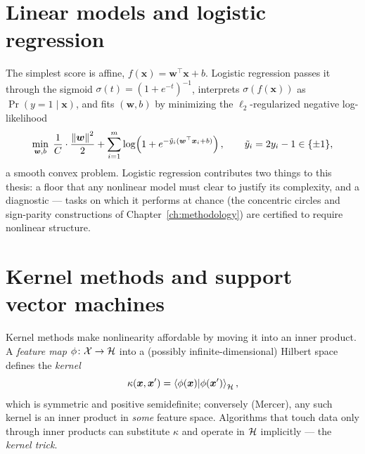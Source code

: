 \section{Linear models and logistic regression}
\label{sec:ml-linear}

The simplest score is affine, $f(\bm{x}) = \bm{w}^{\top} \bm{x} + b$.
Logistic regression passes it through the sigmoid
$\sigma(t) = (1 + e^{-t})^{-1}$, interprets
$\sigma(f(\bm{x}))$ as $\Pr(y = 1 \mid \bm{x})$, and fits $(\bm{w}, b)$ by
minimizing the $\ell_2$-regularized negative log-likelihood
\begin{equation}
  \min_{\bm{w}, b} \; \frac{1}{C} \cdot \frac{\left\lVert\bm{w}\right\rVert^2}{2}
  + \sum_{i=1}^{m} \log\!\left( 1 + e^{-\tilde{y}_i (\bm{w}^{\top}\bm{x}_i + b)} \right),
  \qquad \tilde{y}_i = 2y_i - 1 \in \{\pm 1\},
\end{equation}
a smooth convex problem. Logistic regression contributes two things to this
thesis: a floor that any nonlinear model must clear to justify its complexity,
and a diagnostic --- tasks on which it performs at chance (the concentric
circles and sign-parity constructions of Chapter~\ref{ch:methodology}) are
certified to require nonlinear structure.

\section{Kernel methods and support vector machines}
\label{sec:ml-kernels}

Kernel methods make nonlinearity affordable by moving it into an inner
product. A \emph{feature map} $\phi \colon \mathcal{X} \to \mathcal{H}$ into a
(possibly infinite-dimensional) Hilbert space defines the \emph{kernel}
\begin{equation}
  \kappa(\bm{x}, \bm{x}') = \left\langle\phi(\bm{x})\middle|\phi(\bm{x}')\right\rangle_{\mathcal{H}},
  \label{eq:kernel}
\end{equation}
which is symmetric and positive semidefinite; conversely (Mercer), any such
kernel is an inner product in \emph{some} feature space. Algorithms that touch
data only through inner products can substitute $\kappa$ and operate in
$\mathcal{H}$ implicitly --- the \emph{kernel trick}.

